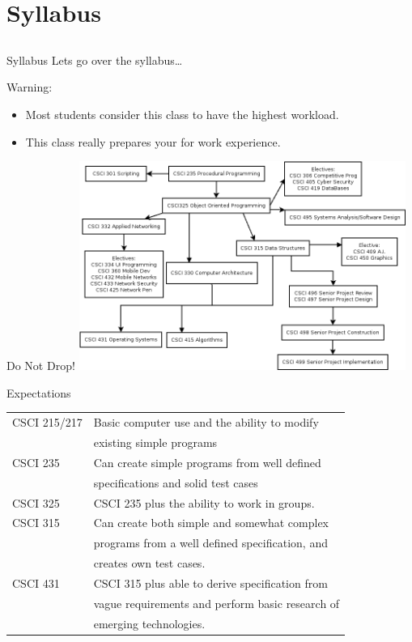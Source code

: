 \documentclass{beamer}
\begin{document}
\section{Syllabus}
\subsection{}

\begin{frame}{Syllabus}
Lets go over the syllabus\ldots
\end{frame}

\begin{frame}{Warning:}
\begin{itemize}
\item Most students consider this class to have the highest workload.
\item This class really prepares your for work experience.
\end{itemize}
\end{frame}

\begin{frame}{Do Not Drop!}
\includegraphics[width=0.8\textwidth]{../imgs/cs-major.png}
\end{frame}

\begin{frame}{Expectations}
\begin{tabular}{l | l }
CSCI 215/217    & Basic computer use and the ability to modify \\ 
                & existing simple programs \\
CSCI 235        & Can create simple programs from well defined \\
                & specifications and solid test cases \\
CSCI 325        & CSCI 235 plus the ability to work in groups. \\
CSCI 315        & Can create both simple and somewhat complex  \\
                & programs from a well defined specification, and \\
                & creates own test cases. \\
CSCI 431        & CSCI 315 plus able to derive specification from \\
                & vague requirements and perform basic research of \\
                & emerging technologies. \\

\end{tabular}
\end{frame}
\end{document}
